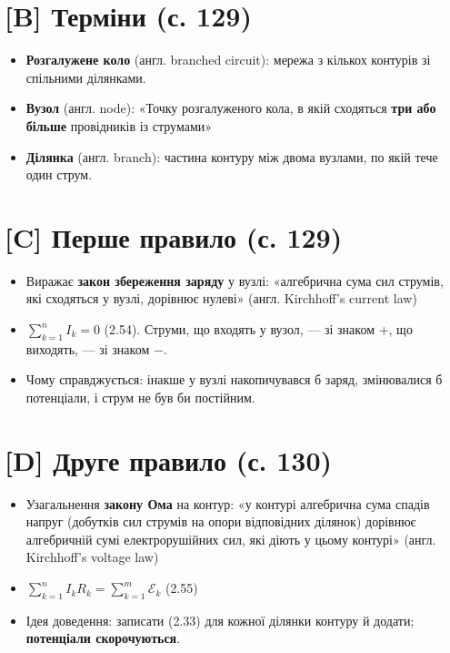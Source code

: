 \documentclass[11pt,a4paper,oneside]{book}
\begin{document}
\section*{[B] Терміни (с. 129)}
\begin{itemize}
\item \textbf{Розгалужене коло} (англ. branched circuit): мережа з кількох контурів зі спільними ділянками.
\item \textbf{Вузол} (англ. node): «Точку розгалуженого кола, в якій сходяться \textbf{три або більше} провідників із струмами»
\item \textbf{Ділянка} (англ. branch): частина контуру між двома вузлами, по якій тече один струм.
\end{itemize}

\section*{[C] Перше правило (с. 129)}
\begin{itemize}
\item Виражає \textbf{закон збереження заряду} у вузлі: «алгебрична сума сил струмів, які сходяться у вузлі, дорівнює нулеві» (англ. Kirchhoff's current law)
\item $\sum_{k=1}^n I_k = 0$ (2.54). Струми, що входять у вузол, — зі знаком +, що виходять, — зі знаком −.
\item Чому справджується: інакше у вузлі накопичувався б заряд, змінювалися б потенціали, і струм не був би постійним.
\end{itemize}

\section*{[D] Друге правило (с. 130)}
\begin{itemize}
\item Узагальнення \textbf{закону Ома} на контур: «у контурі алгебрична сума спадів напруг (добутків сил струмів на опори відповідних ділянок) дорівнює алгебричній сумі електрорушійних сил, які діють у цьому контурі» (англ. Kirchhoff's voltage law)
\item $\sum_{k=1}^n I_kR_k = \sum_{k=1}^m \mathcal E_k$ (2.55)
\item Ідея доведення: записати (2.33) для кожної ділянки контуру й додати; \textbf{потенціали скорочуються}.
\end{itemize}
\end{document}
